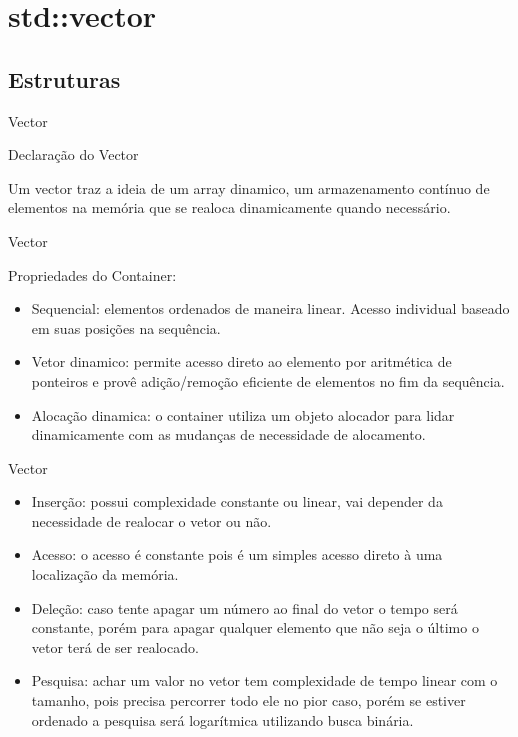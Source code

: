 \section{std::vector}

\subsection{Estruturas}

\begin{frame}[fragile]{Vector}

    \begin{block}{Declaração do Vector}
    \end{block}
	
    Um vector traz a ideia de um array dinamico, um armazenamento contínuo de elementos na memória que se realoca dinamicamente quando necessário.
    
\end{frame}

\begin{frame}[fragile]{Vector}


    Propriedades do Container:

    \begin{itemize}
        \item Sequencial: elementos ordenados de maneira linear. Acesso individual baseado em suas posições na sequência.
        \item Vetor dinamico: permite acesso direto ao elemento por aritmética de ponteiros e provê adição/remoção eficiente de elementos no fim da sequência.
        \item Alocação dinamica: o container utiliza um objeto alocador para lidar dinamicamente com as mudanças de necessidade de alocamento.
    \end{itemize}

\end{frame}

\begin{frame}[fragile]{Vector}

    \begin{itemize}
        \item Inserção: possui complexidade constante ou linear, vai depender da necessidade de realocar o vetor ou não.
        \item Acesso: o acesso é constante pois é um simples acesso direto à uma localização da memória.
        \item Deleção: caso tente apagar um número ao final do vetor o tempo será constante, porém para apagar qualquer elemento que não seja o último o vetor terá de ser realocado.
        \item Pesquisa: achar um valor no vetor tem complexidade de tempo linear com o tamanho, pois precisa percorrer todo ele no pior caso, porém se estiver ordenado a pesquisa será logarítmica utilizando busca binária.
    \end{itemize}

\end{frame}


